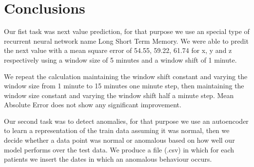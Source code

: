 \chapter*{Conclusions}

Our fist task was next value prediction, for that purpose we use an special type of recurrent neural network name Long Short Term Memory. We were able to predit the next value with a mean square error of 54.55, 59.22, 61.74 for x, y and z respectively using a window size of 5 minutes and a window shift of 1 minute. 

We repeat the calculation maintaining the window shift constant and varying the window size from 1 minute to 15 minutes one minute step, then maintaining the window size constant and varying the window shift half a minute step. Mean Absolute Error does not show any significant improvement.

Our second task was to detect anomalies, for that purpose we use an autoencoder to learn a representation of the train data assuming it was normal, then we decide whether a data point was normal or anomalous based on how well our model performs over the test data. We produce a file (.csv) in which for each patients we insert the dates in which an anomalous behaviour occurs.
